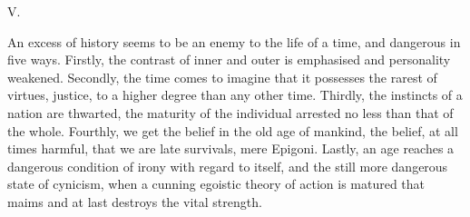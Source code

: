 V.

An excess of history seems to be an enemy to the life of a time, and
dangerous in five ways. Firstly, the contrast of inner and outer is
emphasised and personality weakened. Secondly, the time comes to
imagine that it possesses the rarest of virtues, justice, to a higher
degree than any other time. Thirdly, the instincts of a nation are
thwarted, the maturity of the individual arrested no less than that
of the whole. Fourthly, we get the belief in the old age of mankind,
the belief, at all times harmful, that we are late survivals, mere
Epigoni. Lastly, an age reaches a dangerous condition of irony with
regard to itself, and the still more dangerous state of cynicism,
when a cunning egoistic theory of action is matured that maims and at
last destroys the vital strength.

